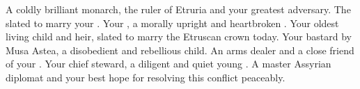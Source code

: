 \documentclass[char]{Kos}
\begin{document}
\begin{contacts}
\contact{\cEtruriaKing{}} A coldly brilliant monarch, the ruler of Etruria and your greatest adversary.
\contact{\cGroom{}} The \cGroom{\human} slated to marry your \cBride{\offspring}.
\contact{\cScythiaQueen{}} Your \cScythiaQueen{\spouse}, a morally upright and heartbroken \cScythiaQueen{\human}.
\contact{\cBride{}} Your oldest living child and heir, slated to marry the Etruscan crown  today.
\contact{\cWard{}} Your bastard \cWard{\offspring} by Musa Astea, a disobedient and rebellious child.
\contact{\cArmsDealer{}} An arms dealer and a close friend of your \cScythiaQueen{\spouse}.
\contact{\cButler{}} Your chief steward, a diligent and quiet young \cButler{\human}.
 A master Assyrian diplomat and your best hope for resolving this conflict peaceably.
\end{contacts}
\end{document}
